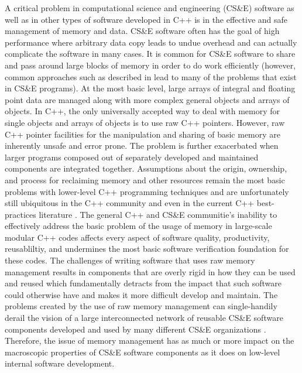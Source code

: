 \documentclass[pdf,ps2pdf,11pt]{SANDreport}
\begin{document}
A critical problem in computational science and engineering (CS\&E)
software as well as in other types of software developed in C++ is in
the effective and safe management of memory and data.  CS\&E software
often has the goal of high performance where arbitrary data copy leads
to undue overhead and can actually complicate the software in many
cases.  It is common for CS\&E software to share and pass around large
blocks of memory in order to do work efficiently (however, common
approaches such as described in
{}\cite{DataSharinginScientificSimulations} lead to many of the
problems that exist in CS\&E programs).  At the most basic level,
large arrays of integral and floating point data are managed along
with more complex general objects and arrays of objects.  In C++, the
only universally accepted way to deal with memory for single objects
and arrays of objects is to use raw C++ pointers.  However, raw C++
pointer facilities for the manipulation and sharing of basic memory
are inherently unsafe and error prone.  The problem is further
exacerbated when larger programs composed out of separately developed
and maintained components are integrated together.  Assumptions about
the origin, ownership, and process for reclaiming memory and other
resources remain the most basic problems with lower-level C++
programming techniques and are unfortunately still ubiquitous in the
C++ community and even in the current C++ best-practices literature
{}\cite{C++CodingStandards05, EffectiveC++ThirdEdition}.  The general
C++ and CS\&E communitie's inability to effectively address the basic
problem of the usage of memory in large-scale modular C++ codes
affects every aspect of software quality, productivity, reusabliltiy,
and undermines the most basic software verification foundation for
these codes.  The challenges of writing software that uses raw memory
management results in components that are overly rigid in how they can
be used and reused which fundamentally detracts from the impact that
such software could otherwise have and makes it more difficult develop
and maintain.  The problems created by the use of raw memory
management can single-handily derail the vision of a large
interconnected network of reusable CS\&E software components developed
and used by many different CS\&E organizations
{}\cite{HPCNeedsAToolsStrategy05}.  Therefore, the issue of memory
management has as much or more impact on the macroscopic properties of
CS\&E software components as it does on low-level internal software
development.
\end{document}
